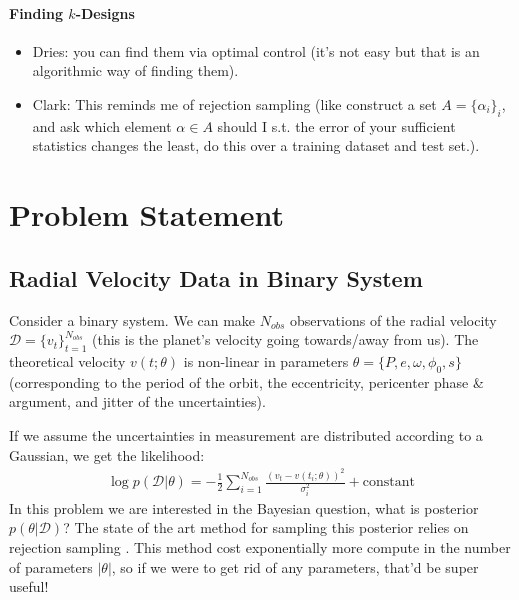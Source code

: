\documentclass{article}
\begin{document}
\paragraph{Finding $k$-Designs}
\begin{itemize}
	\item Dries: you can find them via optimal control (it's not easy but that is an algorithmic way of finding them).
	\item  Clark: This reminds me of rejection sampling (like construct a set $A = \{\alpha_i\}_i$, and ask which element $\alpha \in A$ should I s.t. the error of your sufficient statistics changes the least, do this over a training dataset and test set.).
\end{itemize}

\section{Problem Statement}
\subsection{Radial Velocity Data in Binary System}
Consider a binary system. We can make $N_{obs}$ observations of the radial velocity $\mathcal D  = \{v_t\}_{t=1}^{N_{obs}}$ (this is the planet's velocity going towards/away from us). The theoretical velocity $v(t ; \theta)$ is non-linear in parameters $\theta = \{P, e, \omega, \phi_0, s\}$ (corresponding to the period of the orbit, the eccentricity, pericenter phase \& argument, and jitter of  the uncertainties). 

If we assume the uncertainties in measurement are distributed according to a Gaussian, we get the likelihood:
\begin{align}
	\log p(\mathcal D | \theta)  = - \frac{1}{2} \sum_{i=1}^{N_{obs}} \frac{(v_t - v(t_i; \theta))^2}{\sigma_i^2} +  \text{constant}
\end{align}
In this problem we are interested in the Bayesian question, what is posterior $p(\theta | \mathcal D)$? The state of the art method for sampling this posterior relies on rejection sampling \cite{Price_Whelan_2017}. This method cost exponentially more compute in the number of parameters $|\theta|$, so if we were to get rid of any parameters, that'd be super useful! 
\end{document}

